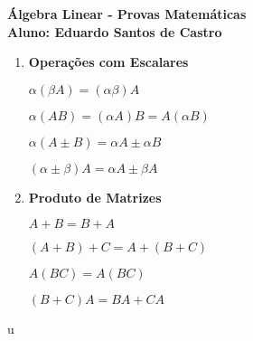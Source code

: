 \usepackage[top=2cm, bottom=2cm, left=2.5cm, right=2.5cm]{geometry}
\usepackage[utf8]{inputenc}
\usepackage{amsmath, amsfonts, amssymb}


\begin{center}
\textbf{Álgebra Linear - Provas Matemáticas \\ Aluno: Eduardo Santos de Castro}
\end{center}

\begin{enumerate}
\item \textbf{Operações com Escalares}

$\alpha(\beta A) = (\alpha \beta) A$

$\alpha (A B) = (\alpha A) B = A (\alpha B)$

$\alpha (A \pm B) = \alpha A \pm \alpha B$

$(\alpha \pm \beta) A = \alpha A \pm \beta A$ \\


\item \textbf{Produto de Matrizes}

$A + B = B + A$

$(A + B) + C = A + (B + C)$

$A(BC) = A(BC)$

$(B + C) A = BA + CA$ \\

\end{enumerate}
u
